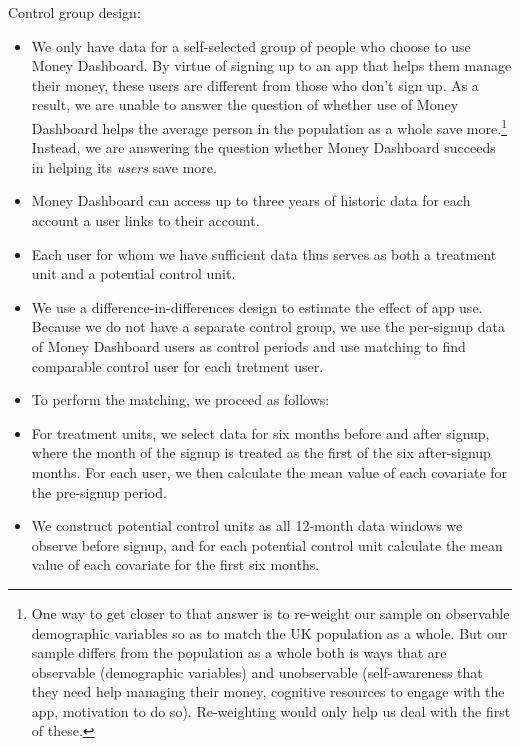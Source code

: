 \documentclass[a4paper, 11pt]{article}
\begin{document}
Control group design:
\begin{itemize}

    \item We only have data for a self-selected group of people who choose to
        use Money Dashboard. By virtue of signing up to an app that helps them
        manage their money, these users are different from those who don't sign
        up. As a result, we are unable to answer the question of whether use of
        Money Dashboard helps the average person in the population as a whole
        save more.\footnote{One way to get closer to that answer is to
            re-weight our sample on observable demographic variables so as to
            match the UK population as a whole. But our sample differs from the
            population as a whole both is ways that are observable (demographic
            variables) and unobservable (self-awareness that they need help
            managing their money, cognitive resources to engage with the app,
            motivation to do so). Re-weighting would only help us deal with the
        first of these.} Instead, we are answering the question whether Money
        Dashboard succeeds in helping its \textit{users} save more.

    \item Money Dashboard can access up to three years of historic data for
        each account a user links to their account.

    \item Each user for whom we have sufficient data thus serves as both a
        treatment unit and a potential control unit.

    \item We use a difference-in-differences design to estimate the effect of
        app use. Because we do not have a separate control group, we use the
        per-signup data of Money Dashboard users as control periods and use
        matching to find comparable control user for each tretment user.

    \item To perform the matching, we proceed as follows:

    \item For treatment units, we select data for six months before and after
        signup, where the month of the signup is treated as the first of the
        six after-signup months. For each user, we then calculate the mean
        value of each covariate for the pre-signup period.

    \item We construct potential control units as all 12-month data windows we
        observe before signup, and for each potential control unit calculate
        the mean value of each covariate for the first six months.


\end{itemize}
\end{document}
